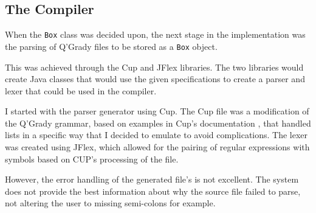\documentclass[report.tex]{subfiles}
\begin{document}
\subsection{The Compiler} %
\label{sub:the_compiler}
When the \texttt{Box} class was decided upon, the next stage in the
implementation was the parsing of Q'Grady files to be stored as a \texttt{Box}
object.

This was achieved through the Cup and JFlex libraries. The two libraries would
create Java classes that would use the given specifications to create a parser
and lexer that could be used in the compiler.

I started with the parser generator using Cup. The Cup file was a modification
of the Q'Grady grammar, based on examples in Cup's documentation 
\cite{cup_example}, that handled lists in a specific way that I decided to
emulate to avoid complications. The lexer was created using JFlex, which
allowed for the pairing of regular expressions with symbols based on CUP's
processing of the file.

However, the error handling of the generated file's is not excellent. The system
does not provide the best information about why the source file failed to parse,
not altering the user to missing semi-colons for example.
\newpage
\end{document}
